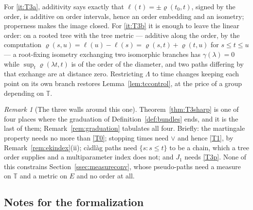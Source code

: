 \documentclass[11pt,a4paper]{article}
\theoremstyle{plain}
\theoremstyle{definition}
\theoremstyle{remark}
\newtheorem{remark}[theorem]{Remark}
\newcommand{\T}{\mathbb{T}}                     %
\begin{document}
For \ref{it:T3a}, additivity says exactly that $\ell(t) = \pm \varrho(t_0,t)$,
signed by the order, is additive on order intervals, hence an order embedding
and an isometry; properness makes the image closed.  For \ref{it:T3b} it is
enough to leave the linear order: on a rooted tree with the tree metric ---
additive along the order, by the computation
$\varrho(s,u) = \ell(u) - \ell(s) = \varrho(s,t) + \varrho(t,u)$ for $s \leq t \leq u$ ---
a root-fixing isometry exchanging two isomorphic branches has
$\gamma(\lambda) = 0$ while $\sup_t \varrho(\lambda t, t)$ is of the order of
the diameter, and two paths differing by that exchange are at distance zero.
Restricting $\Lambda$ to time changes keeping each point on its own branch
restores Lemma~\ref{lem:tccontrol}, at the price of a group depending on $\T$.

\begin{remark}[The three walls around this one]
  \label{rem:skorokhodwalls}
  Theorem~\ref{thm:T3sharp} is one of four places where the graduation of
  Definition~\ref{def:bundles} ends, and it is the last of them;
  Remark~\ref{rem:graduation} tabulates all four.  Briefly: the martingale
  property needs no more than \eqref{T0}; stopping times need $\vee$ and hence
  \eqref{T1}, by Remark~\ref{rem:ekindex}(ii); c\`adl\`ag paths need
  $\{s : s \leq t\}$ to be a chain, which a tree order supplies and a
  multiparameter index does not; and $J_1$ needs \eqref{T3p}.  None of this
  constrains Section~\ref{ssec:measureconv}, whose pseudo-paths need a measure on
  $\T$ and a metric on $E$ and no order at all.
\end{remark}

\subsection{Notes for the formalization}
\label{ssec:skorokhodform}
\end{document}
